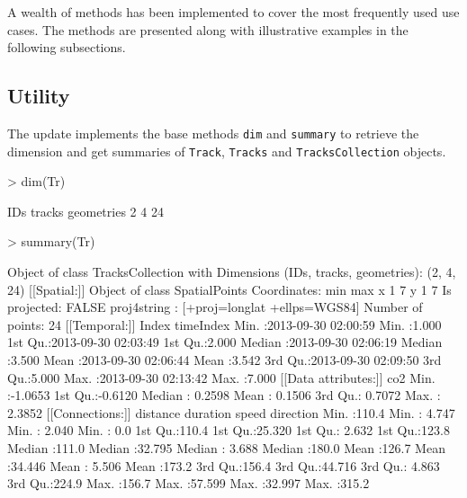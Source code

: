 \documentclass{article}
\newcommand{\code}[1]{{\tt #1}}
\begin{document}
A wealth of methods has been implemented to cover the most frequently used use cases. The methods are presented along with illustrative examples in the following subsections.

\subsection{Utility}

The update implements the base methods \code{dim} and \code{summary} to retrieve the dimension and get summaries of \code{Track}, \code{Tracks} and \code{TracksCollection} objects.

\begin{Schunk}
\begin{Sinput}
> dim(Tr)
\end{Sinput}
\begin{Soutput}
       IDs     tracks geometries 
         2          4         24 
\end{Soutput}
\begin{Sinput}
> summary(Tr)
\end{Sinput}
\begin{Soutput}
Object of class TracksCollection
 with Dimensions (IDs, tracks, geometries): (2, 4, 24)
[[Spatial:]]
Object of class SpatialPoints
Coordinates:
  min max
x   1   7
y   1   7
Is projected: FALSE 
proj4string : [+proj=longlat +ellps=WGS84]
Number of points: 24
[[Temporal:]]
     Index                       timeIndex    
 Min.   :2013-09-30 02:00:59   Min.   :1.000  
 1st Qu.:2013-09-30 02:03:49   1st Qu.:2.000  
 Median :2013-09-30 02:06:19   Median :3.500  
 Mean   :2013-09-30 02:06:44   Mean   :3.542  
 3rd Qu.:2013-09-30 02:09:50   3rd Qu.:5.000  
 Max.   :2013-09-30 02:13:42   Max.   :7.000  
[[Data attributes:]]
      co2         
 Min.   :-1.0653  
 1st Qu.:-0.6120  
 Median : 0.2598  
 Mean   : 0.1506  
 3rd Qu.: 0.7072  
 Max.   : 2.3852  
[[Connections:]]
    distance        duration          speed          direction    
 Min.   :110.4   Min.   : 4.747   Min.   : 2.040   Min.   :  0.0  
 1st Qu.:110.4   1st Qu.:25.320   1st Qu.: 2.632   1st Qu.:123.8  
 Median :111.0   Median :32.795   Median : 3.688   Median :180.0  
 Mean   :126.7   Mean   :34.446   Mean   : 5.506   Mean   :173.2  
 3rd Qu.:156.4   3rd Qu.:44.716   3rd Qu.: 4.863   3rd Qu.:224.9  
 Max.   :156.7   Max.   :57.599   Max.   :32.997   Max.   :315.2  
\end{Soutput}
\end{Schunk}
\end{document}
